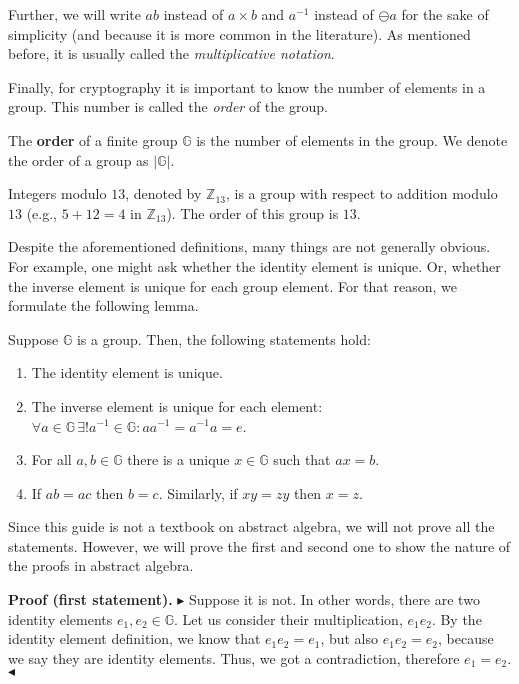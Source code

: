 \documentclass[../lecture-notes-148x210.tex]{subfiles}
\begin{document}
\begin{remark}
    Further, we will write $ab$ instead of $a \times b$ and $a^{-1}$ instead of $\ominus a$ for the sake of simplicity (and because it is more common in the literature). As mentioned before, it is usually called the \textit{multiplicative notation}.
\end{remark}

Finally, for cryptography it is important to know the number of elements in a group. This number is called the \textit{order} of the group.
\begin{definition}
    The \textbf{order} of a finite group $\mathbb{G}$ is the number of elements in the group. We denote the order of a group as $|\mathbb{G}|$.
\end{definition}
\begin{example}
    Integers modulo $13$, denoted by $\mathbb{Z}_{13}$, is a group with respect to addition modulo $13$ 
    (e.g., $5+12=4$ in $\mathbb{Z}_{13}$). The order of this group is $13$.
\end{example}

Despite the aforementioned definitions, many things are not generally obvious. For example, one might ask whether the identity element is unique. Or, 
whether the inverse element is unique for each group element. For that reason, we formulate the following lemma.

\begin{lemma}
    Suppose $\mathbb{G}$ is a group. Then, the following statements hold:
    \begin{enumerate}
        \item The identity element is unique.
        \item The inverse element is unique for each element: $\forall a \in \mathbb{G} \, \exists! a^{-1} \in \mathbb{G}: aa^{-1} = a^{-1}a = e$.
        \item For all $a,b \in \mathbb{G}$ there is a unique $x \in \mathbb{G}$ such that $ax = b$.
        \item If $ab=ac$ then $b=c$. Similarly, if $xy=zy$ then $x=z$.
    \end{enumerate}
\end{lemma}

Since this guide is not a textbook on abstract algebra, we will not prove all the statements. However, we will prove the first and second one to show the nature of the proofs in abstract algebra.

\textbf{Proof (first statement).}
$\blacktriangleright$ 
Suppose it is not. In other words, there are two identity elements $e_1, e_2 \in \mathbb{G}$. Let us 
consider their multiplication, $e_1e_2$. By the identity element definition, we know that 
$e_1e_2 = e_1$, but also $e_1e_2 = e_2$, because we say they are identity elements. 
Thus, we got a contradiction, therefore $e_1 = e_2$.
$\blacktriangleleft$
\end{document}
